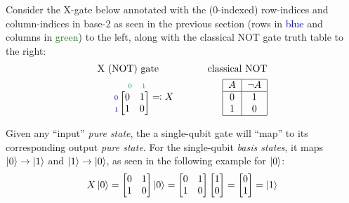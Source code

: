 \documentclass[conference]{IEEEtran}
\begin{document}
Consider the X-gate below annotated with the (0-indexed) row-indices and column-indices in
base-2 as seen in the previous section (rows in \textcolor{blue}{blue} and columns in \textcolor{Green}{green}) to the left,
along with the classical NOT gate truth table to the right:
\begin{align*}
    \text{X (NOT) gate} \ \ \ \ \ \ \ \ \ \ \ \ \ \ \ \text{classical NOT}\\
    \begin{matrix}
        \begin{matrix}
        & {\scriptstyle\textcolor{Green}{0}} & {\scriptstyle\textcolor{Green}{1}}
        \end{matrix}
        \\
        \begin{matrix}
        {\scriptstyle\textcolor{blue}{0}} \\
        {\scriptstyle\textcolor{blue}{1}}
        \end{matrix}
        \begin{bmatrix}
        0 & 1 \\
        1 & 0
        \end{bmatrix}
    \end{matrix}
    \eqcolon X
    \ \ \ \ \ \ \ \ \ \ \ \ \ \ \
    \begin{tabular}{|c|c|}
        \hline
        $A$ & $\neg A$ \\
        \hline
        0 & 1 \\
        1 & 0 \\
        \hline
    \end{tabular}
\end{align*}

Given any ``input'' \textit{pure state}, the a single-qubit gate will ``map'' to its corresponding output \textit{pure state}.
For the single-qubit \textit{basis states}, it maps $\ket{0}\to \ket{1}$ and $\ket{1}\to \ket{0}$, as seen in the following example for $\ket{0}$:
\begin{align*}
    X\ket{0} =
    \begin{bmatrix}
        0 & 1 \\
        1 & 0
    \end{bmatrix}
    \ket{0}
    =
    \begin{bmatrix}
        0 & 1 \\
        1 & 0
    \end{bmatrix}
    \begin{bmatrix}
        1 \\
        0
    \end{bmatrix}
    =
    \begin{bmatrix}
        0 \\
        1
    \end{bmatrix}
    = \ket{1}
\end{align*}
\end{document}
